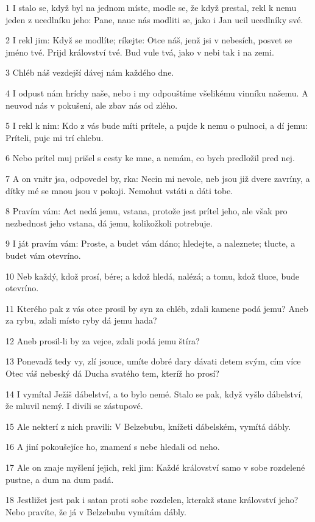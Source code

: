 \par 1 I stalo se, když byl na jednom míste, modle se, že když prestal, rekl k nemu jeden z ucedlníku jeho: Pane, nauc nás modliti se, jako i Jan ucil ucedlníky své.
\par 2 I rekl jim: Když se modlíte; ríkejte: Otce náš, jenž jsi v nebesích, posvet se jméno tvé. Prijd království tvé. Bud vule tvá, jako v nebi tak i na zemi.
\par 3 Chléb náš vezdejší dávej nám každého dne.
\par 4 I odpust nám hríchy naše, nebo i my odpouštíme všelikému vinníku našemu. A neuvod nás v pokušení, ale zbav nás od zlého.
\par 5 I rekl k nim: Kdo z vás bude míti prítele, a pujde k nemu o pulnoci, a dí jemu: Príteli, pujc mi trí chlebu.
\par 6 Nebo prítel muj prišel s cesty ke mne, a nemám, co bych predložil pred nej.
\par 7 A on vnitr jsa, odpovedel by, rka: Necin mi nevole, neb jsou již dvere zavríny, a dítky mé se mnou jsou v pokoji. Nemohut vstáti a dáti tobe.
\par 8 Pravím vám: Act nedá jemu, vstana, protože jest prítel jeho, ale však pro nezbednost jeho vstana, dá jemu, kolikožkoli potrebuje.
\par 9 I ját pravím vám: Proste, a budet vám dáno; hledejte, a naleznete; tlucte, a budet vám otevríno.
\par 10 Neb každý, kdož prosí, bére; a kdož hledá, nalézá; a tomu, kdož tluce, bude otevríno.
\par 11 Kterého pak z vás otce prosil by syn za chléb, zdali kamene podá jemu? Aneb za rybu, zdali místo ryby dá jemu hada?
\par 12 Aneb prosil-li by za vejce, zdali podá jemu štíra?
\par 13 Ponevadž tedy vy, zlí jsouce, umíte dobré dary dávati detem svým, cím více Otec váš nebeský dá Ducha svatého tem, kteríž ho prosí?
\par 14 I vymítal Ježíš dábelství, a to bylo nemé. Stalo se pak, když vyšlo dábelství, že mluvil nemý. I divili se zástupové.
\par 15 Ale nekterí z nich pravili: V Belzebubu, knížeti dábelském, vymítá dábly.
\par 16 A jiní pokoušejíce ho, znamení s nebe hledali od neho.
\par 17 Ale on znaje myšlení jejich, rekl jim: Každé království samo v sobe rozdelené pustne, a dum na dum padá.
\par 18 Jestližet jest pak i satan proti sobe rozdelen, kterakž stane království jeho? Nebo pravíte, že já v Belzebubu vymítám dábly.
